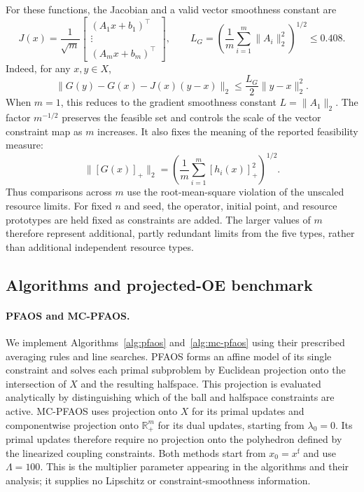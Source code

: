 For these functions, the Jacobian and a valid vector smoothness constant
are
\begin{equation}\label{eq:numerical_constraint_smoothness}
J(x)=\frac{1}{\sqrt m}\begin{bmatrix}(A_1x+b_1)^\top\\ \vdots\\ (A_mx+b_m)^\top\end{bmatrix},
\qquad
L_G=\left(\frac1m\sum_{i=1}^m\|A_i\|_2^2\right)^{1/2}\le0.408.
\end{equation}
Indeed, for any $x,y\in X$,
\[
\|G(y)-G(x)-J(x)(y-x)\|_2
\le\frac{L_G}{2}\|y-x\|_2^2.
\]
When $m=1$, this reduces to the gradient smoothness constant
$L=\|A_1\|_2$. The factor $m^{-1/2}$ preserves the feasible set and
controls the scale of the vector constraint map as $m$ increases. It also
fixes the meaning of the reported feasibility measure:
\begin{equation}\label{eq:numerical_rms_violation}
\|[G(x)]_+\|_2
=\left(\frac1m\sum_{i=1}^m[h_i(x)]_+^2\right)^{1/2}.
\end{equation}
Thus comparisons across $m$ use the root-mean-square violation of the
unscaled resource limits. For fixed $n$ and seed, the operator, initial
point, and resource prototypes are held fixed as constraints are added.
The larger values of $m$ therefore represent additional, partly redundant
limits from the five types, rather than additional independent resource
types.

\subsection{Algorithms and projected-OE benchmark}
\label{subsec:numerical_methods}

\paragraph{PFAOS and MC-PFAOS.}
We implement Algorithms~\ref{alg:pfaos} and~\ref{alg:mc-pfaos} using their
prescribed averaging rules and line searches. PFAOS forms an affine model
of its single constraint and solves each primal subproblem by Euclidean
projection onto the intersection of $X$ and the resulting halfspace. This
projection is evaluated analytically by distinguishing which of the ball
and halfspace constraints are active. MC-PFAOS uses projection onto $X$
for its primal updates and componentwise projection onto
$\mathbb R_+^m$ for its dual updates, starting from $\lambda_0=0$.
Its primal updates therefore require no projection onto the polyhedron
defined by the linearized coupling constraints. Both methods start from
$x_0=x^{\mathrm f}$ and use $\Lambda=100$. This is the multiplier
parameter appearing in the algorithms and their analysis; it supplies no
Lipschitz or constraint-smoothness information.

